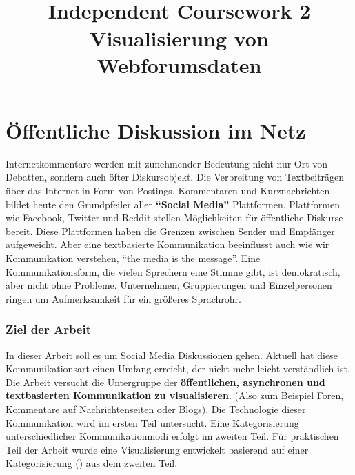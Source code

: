\documentclass[nobib, nohyper, a4paper,openany]{tufte-book}
\title[IC 2]{
  \vfill
\usebox{\titleimage}\\
\noindent
\huge{Independent Coursework 2}\\
\noindent\Large{Visualisierung von Webforumsdaten}}
\begin{document}
\maketitle
\tableofcontents



\chapter{Öffentliche Diskussion im Netz}
 
Internetkommentare werden mit zunehmender Bedeutung nicht nur Ort von Debatten, sondern auch öfter Diskursobjekt. 
Die Verbreitung von Textbeiträgen über das Internet in Form von Postings, Kommentaren und Kurznachrichten bildet heute den Grundpfeiler aller \textbf{``Social Media''} Plattformen.
Plattformen wie Facebook, Twitter und Reddit stellen Möglichkeiten für öffentliche Diskurse bereit.
Diese Plattformen haben die Grenzen zwischen Sender und Empfänger aufgeweicht. 
Aber eine textbasierte Kommunikation beeinflusst auch wie wir Kommunikation verstehen, ``the media is the message''.
Eine Kommunikationsform, die vielen Sprechern eine Stimme gibt, ist demokratisch, aber nicht ohne Probleme.
Unternehmen, Gruppierungen und Einzelpersonen ringen um Aufmerksamkeit für ein größeres Sprachrohr. 
 

\subsection{Ziel der Arbeit}
In dieser Arbeit soll es um Social Media Diskussionen gehen. 
Aktuell hat diese Kommunikationsart einen Umfang erreicht, der nicht mehr leicht verständlich ist.
Die Arbeit versucht die Untergruppe der \textbf{öffentlichen, asynchronen und textbasierten Kommunikation zu visualisieren}.
(Also zum Beispiel Foren, Kommentare auf Nachrichtenseiten oder Blogs).
Die Technologie dieser Kommunikation wird im ersten Teil untersucht. 
Eine Kategorisierung unterschiedlicher Kommunikationmodi erfolgt im zweiten Teil.
Für praktischen Teil der Arbeit wurde eine Visualisierung entwickelt basierend auf einer 
Kategorisierung () aus dem zweiten Teil.
\end{document}
